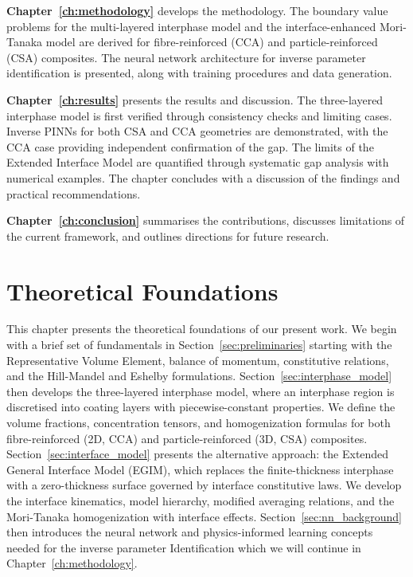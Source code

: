 \documentclass[oneside, 12pt, a4paper, bibliography=totoc]{book}
\begin{document}
\textbf{Chapter~\ref{ch:methodology}} develops the methodology. The boundary value problems for the multi-layered interphase model and the interface-enhanced Mori-Tanaka model are derived for fibre-reinforced (CCA) and particle-reinforced (CSA) composites. The neural network architecture for inverse parameter identification is presented, along with training procedures and data generation.

\textbf{Chapter~\ref{ch:results}} presents the results and discussion. The three-layered interphase model is first verified through consistency checks and limiting cases. Inverse PINNs for both CSA and CCA geometries are demonstrated, with the CCA case providing independent confirmation of the gap. The limits of the Extended Interface Model are quantified through systematic gap analysis with numerical examples. The chapter concludes with a discussion of the findings and practical recommendations.

\textbf{Chapter~\ref{ch:conclusion}} summarises the contributions, discusses limitations of the current framework, and outlines directions for future research.



\chapter{Theoretical Foundations}
\label{ch:theory}

This chapter presents the theoretical foundations of our present work. We begin with a brief set of fundamentals in Section~\ref{sec:preliminaries} starting with the Representative Volume Element, balance of momentum, constitutive relations, and the Hill-Mandel and Eshelby formulations. Section~\ref{sec:interphase_model} then develops the three-layered interphase model, where an interphase region is discretised into coating layers with piecewise-constant properties. We define the volume fractions, concentration tensors, and homogenization formulas for both fibre-reinforced (2D, CCA) and particle-reinforced (3D, CSA) composites. Section~\ref{sec:interface_model} presents the alternative approach: the Extended General Interface Model (EGIM), which replaces the finite-thickness interphase with a zero-thickness surface governed by interface constitutive laws. We develop the interface kinematics, model hierarchy, modified averaging relations, and the Mori-Tanaka homogenization with interface effects. Section~\ref{sec:nn_background} then introduces the neural network and physics-informed learning concepts needed for the inverse parameter Identification which we will continue in Chapter~\ref{ch:methodology}.
\end{document}
